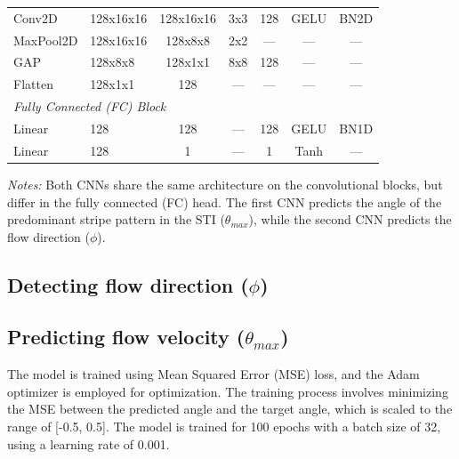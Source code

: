 \documentclass[12pt]{elsarticle}
\begin{document}
\begin{table}[!htbp]
{\begin{tabular}{llccccc}
        Conv2D                    & 128x16x16           & 128x16x16           & 3x3     & 128           & GELU   & BN2D    \\
        MaxPool2D                 & 128x16x16           & 128x8x8             & 2x2     & ---           & ---  & ---       \\
        GAP  & 128x8x8             & 128x1x1             & 8x8     & 128           & ---   & ---     \\
        Flatten                   & 128x1x1             & 128                 & ---     & ---           & ---  & ---       \\
        \midrule
        \multicolumn{6}{l}{\textit{Fully Connected (FC) Block}} \\
        Linear                    & 128                 & 128                 & ---     & 128           & GELU    & BN1D   \\
        Linear                    & 128                 & 1                   & ---     & 1             & Tanh  & ---      \\
        \bottomrule
    \end{tabular}
    } %
    \par\medskip\footnotesize
    \textit{Notes:} Both CNNs share the same architecture on the convolutional blocks, but differ in the fully connected (FC) head. The first CNN predicts the angle of the predominant stripe pattern in the STI ($\theta_{max}$), while the second CNN predicts the flow direction ($\phi$). 
\end{table}

\subsection{Detecting flow direction ($\phi$)}


\subsection{Predicting flow velocity ($\theta_{max}$)}
The model is trained using Mean Squared Error (MSE) loss, and the Adam optimizer is employed for optimization. The training process involves minimizing the MSE between the predicted angle and the target angle, which is scaled to the range of [-0.5, 0.5]. The model is trained for 100 epochs with a batch size of 32, using a learning rate of 0.001.


\newpage

\end{document}

